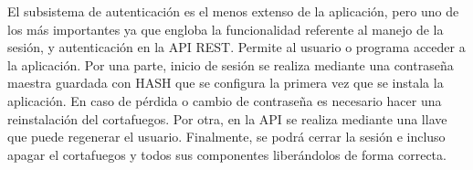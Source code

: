 El subsistema de autenticación es el menos extenso de la aplicación, pero uno de los más importantes ya que engloba la funcionalidad referente al manejo de la sesión, y autenticación en la API REST. Permite al usuario o programa acceder a la aplicación.
Por una parte, inicio de sesión se realiza mediante una contraseña maestra guardada con HASH que se configura la primera vez que se instala la aplicación. En caso de pérdida o cambio de contraseña es necesario hacer una reinstalación del cortafuegos. Por otra, en la API se realiza mediante una llave que puede regenerar el usuario.
Finalmente, se podrá cerrar la sesión e incluso apagar el cortafuegos y todos sus componentes liberándolos de forma correcta.
